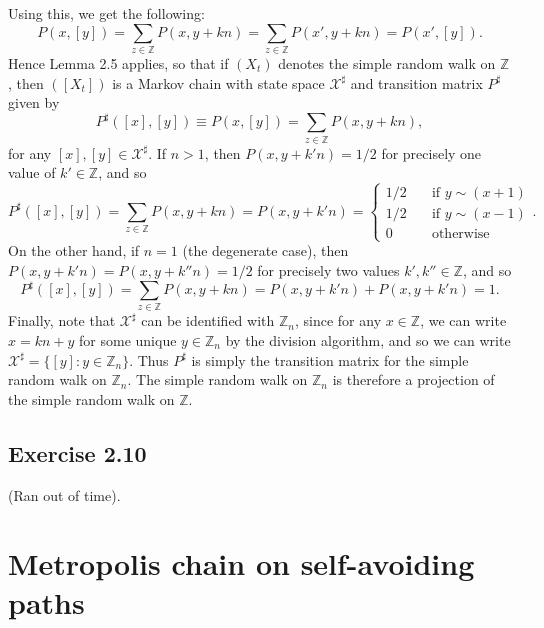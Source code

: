 \documentclass[12pt]{article}
\begin{document}
Using this, we get the following:
\begin{equation*}
P(x, [y]) = \sum_{z \in \mathbb{Z}} P(x, y+kn) = \sum_{z \in \mathbb{Z}} P(x', y+kn) = P(x', [y]).
\end{equation*}
Hence Lemma 2.5 applies, so that if $(X_t)$ denotes the simple random walk on $\mathbb{Z}$, then $([X_t])$ is a Markov chain with state space $\mathcal{X}^\sharp$ and transition matrix $P^\sharp$ given by
\begin{equation*}
P^\sharp([x], [y]) \equiv P(x, [y]) = \sum_{z \in \mathbb{Z}} P(x, y+kn),
\end{equation*}
for any $[x], [y] \in \mathcal{X}^\sharp$. If $n > 1$, then $P(x, y+k'n) = 1/2$ for precisely one value of $k' \in \mathbb{Z}$, and so
\begin{equation*}
P^\sharp([x], [y]) = \sum_{z \in \mathbb{Z}} P(x, y+kn) = P(x, y+k'n)
= \begin{cases}
1/2 & \quad \text{if $y \sim (x+1)$} \\
1/2 & \quad \text{if $y \sim (x-1)$} \\
0 & \quad \text{otherwise}
\end{cases}.
\end{equation*}
On the other hand, if $n = 1$ (the degenerate case), then $P(x, y+k'n) = P(x, y+k''n) = 1/2$ for precisely two values $k', k'' \in \mathbb{Z}$, and so
\begin{equation*}
P^\sharp([x], [y]) = \sum_{z \in \mathbb{Z}} P(x, y+kn) = P(x, y+k'n) + P(x, y+k'n) = 1.
\end{equation*}
Finally, note that $\mathcal{X}^\sharp$ can be identified with $\mathbb{Z}_n$, since for any $x \in \mathbb{Z}$, we can write $x = kn + y$ for some unique $y \in \mathbb{Z}_n$ by the division algorithm, and so we can write $\mathcal{X}^\sharp = \{[y] : y \in \mathbb{Z}_n\}$. Thus $P^\sharp$ is simply the transition matrix for the simple random walk on $\mathbb{Z}_n$. The simple random walk on $\mathbb{Z}_n$ is therefore a projection of the simple random walk on $\mathbb{Z}$.

\subsection*{Exercise 2.10}

(Ran out of time).

\section*{Metropolis chain on self-avoiding paths}
\end{document}
